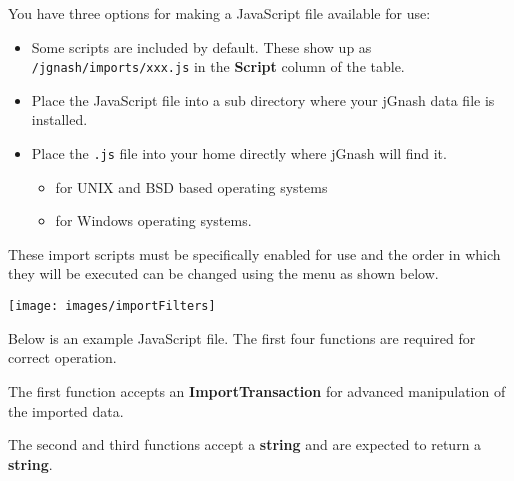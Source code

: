 \documentclass[letterpaper,12pt]{book}
\begin{document}
    You have three options for making a JavaScript file available for use:
    \begin{itemize}
        \item Some scripts are included by default. These show up as \texttt{/jgnash/imports/xxx.js}
        in the \textbf{Script} column of the table.
        \item Place the JavaScript file into a  sub directory where
        your jGnash data file is installed.
        \item Place the \texttt{.js} file into your home directly where jGnash will find it.
        \begin{itemize}
            \item {} for UNIX and BSD based operating systems
            \item {} for Windows operating systems.
        \end{itemize}
    \end{itemize}

    These import scripts must be specifically enabled for use and the order in which they will be executed can be changed
    using the  menu as shown below.

    \texttt{[image: images/importFilters]}

    \newpage
    Below is an example JavaScript file. The first four functions are required for correct operation.

    The first function accepts an \textbf{ImportTransaction} for advanced manipulation of the imported data.

    The second and third functions accept a \textbf{string} and are expected to return a \textbf{string}.
\end{document}
